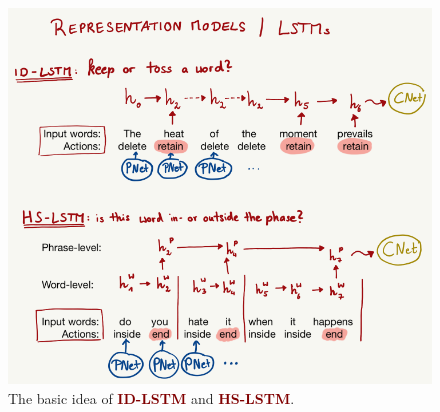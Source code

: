 \documentclass{article}
\begin{document}
\begin{figure}[h]
    \centering
    \includegraphics[scale=.4]{lstms_overview.png}
    \caption{The basic idea of \textcolor{Maroon}{\textbf{ID-LSTM}} and \textcolor{Maroon}{\textbf{HS-LSTM}}.}
    \label{fig:lstms_overview}

\end{figure}
\newpage
\end{document}
